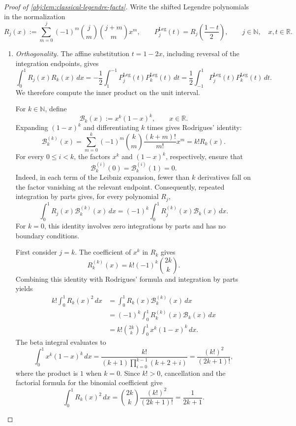 \documentclass[11pt]{article}
\begin{document}
\begin{proof}[Proof of \cref{obj:lem:classical-legendre-facts}]
Write the shifted Legendre polynomials in the normalization
\[
R_j(x):=\sum_{m=0}^{j}(-1)^m
  \binom{j}{m}\binom{j+m}{m}x^m,
\qquad
P_j^{\mathrm{Leg}}(t)=R_j\!\left(\frac{1-t}{2}\right),
\qquad j\in\mathbb N,\quad x,t\in\mathbb R.
\]

\begin{enumerate}
\item \emph{Orthogonality.}
The affine substitution \(t=1-2x\), including reversal of the integration endpoints, gives
\[
\int_0^1R_j(x)R_k(x)\,dx
=-\frac12\int_1^{-1}
  P_j^{\mathrm{Leg}}(t)P_k^{\mathrm{Leg}}(t)\,dt
=\frac12\int_{-1}^1
  P_j^{\mathrm{Leg}}(t)P_k^{\mathrm{Leg}}(t)\,dt.
\]
We therefore compute the inner product on the unit interval.

For \(k\in\mathbb N\), define
\[
\mathcal B_k(x):=x^k(1-x)^k,
\qquad x\in\mathbb R.
\]
Expanding \((1-x)^k\) and differentiating \(k\) times gives Rodrigues' identity:
\[
\mathcal B_k^{(k)}(x)
=\sum_{m=0}^k(-1)^m\binom{k}{m}
  \frac{(k+m)!}{m!}x^m
=k!R_k(x).
\]
For every \(0\le i<k\), the factors \(x^k\) and \((1-x)^k\), respectively, ensure that
\[
\mathcal B_k^{(i)}(0)=\mathcal B_k^{(i)}(1)=0.
\]
Indeed, in each term of the Leibniz expansion, fewer than \(k\) derivatives fall on the factor vanishing at the relevant endpoint. Consequently, repeated integration by parts gives, for every polynomial \(R_j\),
\[
\int_0^1R_j(x)\mathcal B_k^{(k)}(x)\,dx
=(-1)^k\int_0^1R_j^{(k)}(x)\mathcal B_k(x)\,dx.
\]
For \(k=0\), this identity involves zero integrations by parts and has no boundary conditions.

First consider \(j=k\). The coefficient of \(x^k\) in \(R_k\) gives
\[
R_k^{(k)}(x)=k!(-1)^k\binom{2k}{k}.
\]
Combining this identity with Rodrigues' formula and integration by parts yields
\[
\begin{aligned}
k!\int_0^1R_k(x)^2\,dx
&=\int_0^1R_k(x)\mathcal B_k^{(k)}(x)\,dx\\
&=(-1)^k\int_0^1R_k^{(k)}(x)\mathcal B_k(x)\,dx\\
&=k!\binom{2k}{k}\int_0^1x^k(1-x)^k\,dx.
\end{aligned}
\]
The beta integral evaluates to
\[
\int_0^1x^k(1-x)^k\,dx
=\frac{k!}{(k+1)\prod_{i=0}^{k-1}(k+2+i)}
=\frac{(k!)^2}{(2k+1)!},
\]
where the product is \(1\) when \(k=0\). Since \(k!>0\), cancellation and the factorial formula for the binomial coefficient give
\[
\int_0^1R_k(x)^2\,dx
=\binom{2k}{k}\frac{(k!)^2}{(2k+1)!}
=\frac{1}{2k+1}.
\]


\end{enumerate}
\end{proof}
\end{document}
